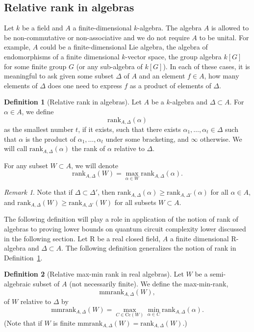 \documentclass[10pt]{amsart}
\theoremstyle{definition}
\newtheorem{definition}{Definition}[section]
\theoremstyle{remark}
\newtheorem{remark}{Remark}
\numberwithin{equation}{section}
\newcommand {\R} {\mathrm{R}}
\newcommand{\rank}{\mathrm{rank}}
\newcommand{\Cc}{\mathrm{Cc}}
\newcommand{\mmrank}{\mathrm{mmrank}}
\begin{document}
\subsection{Relative rank in algebras}
Let $k$ be a field and $A$ a finite-dimensional $k$-algebra. The algebra $A$ is allowed to be non-commutative or non-associative and we do not require $A$ to be unital.  For example, $A$ could be a finite-dimensional Lie algebra, the algebra of endomorphisms of a finite dimensional $k$-vector space, the group algebra
$k[G]$ for some finite group $G$ (or any sub-algebra of $k[G]$). In each of these cases, it is meaningful to ask
given some subset $\Delta$ of $A$ and an element $f\in A$, how many elements of $\Delta$ does one need to express $f$ as a product of elements of $\Delta$.

\begin{definition}[Relative rank in algebras]
\label{def:rank:algebra}
Let $A$ be a $k$-algebra and $\Delta \subset A$. 
For $\alpha \in A$, we define
\[
\rank_{A,\Delta}(\alpha)
\]
as the smallest number $t$, if it exists, such that there exists $\alpha_1,\ldots,\alpha_t \in \Delta$ such that $\alpha$  
is the product of $\alpha_1, \ldots, \alpha_t$ under some bracketing, and $\infty$ otherwise.
We will call
$\rank_{A,\Delta}(\alpha)$ the rank of $\alpha$ relative to $\Delta$.

For any subset $W \subset A$, we will denote 
\[
\rank_{A,\Delta}(W) = \max_{\alpha\in W} \rank_{A,\Delta}(\alpha).
\]
\end{definition}

\begin{remark}
\label{rem:rank:algebra:monotone}
    Note that if $\Delta \subset \Delta'$, then $\rank_{A,\Delta}(\alpha) \geq \rank_{A,\Delta'}(\alpha)$ for all $\alpha \in A$, and 
    $\rank_{A,\Delta}(W) \geq \rank_{A,\Delta'}(W)$ for all subsets 
    $W \subset A$.
\end{remark}

The following definition will play a role in application of the notion of rank of algebras to proving lower bounds on quantum circuit complexity lower discussed in the following section.
Let $\R$ be a real closed field, $A$ a finite dimensional $\R$-algebra and 
$\Delta \subset A$.
The following definition generalizes the notion of rank in Definition~\ref{def:rank:algebra}.

\begin{definition}[Relative max-min rank in real algebras]
\label{def:mmrank:algebra}
Let
$W$ be a semi-algebraic subset of $A$ (not necessarily finite). 
We define the max-min-rank, 
\[
\mmrank_{A,\Delta}(W),
\]of 
$W$ relative to $\Delta$ by
\[
\mmrank_{A,\Delta}(W) = \max_{C \in \Cc(W)} 
\min_{\alpha \in C} \rank_{A,\Delta}(\alpha).
\]
(Note that if $W$ is finite 
$\mmrank_{A,\Delta}(W) = \rank_{A,\Delta}(W)$.)
\end{definition}
\end{document}
